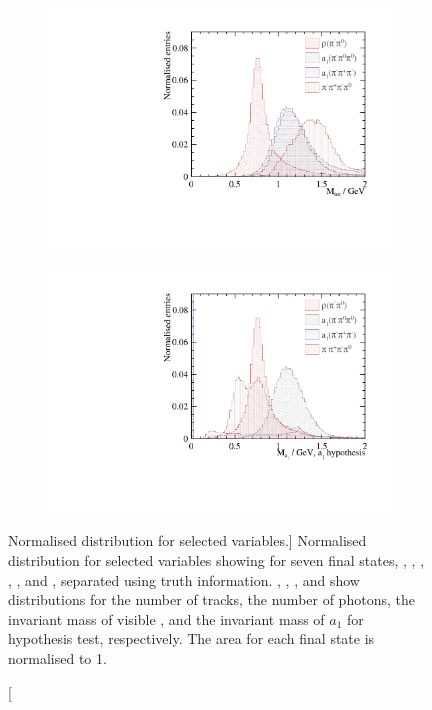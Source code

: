 \begin{figure}[htbp]
\begin{subfigure}[b]{0.45\textwidth}
  \caption{}
  \label{fig:tauVarNPhoton}
\end{subfigure}
\begin{subfigure}[b]{0.45\textwidth}
 \includegraphics[width=\textwidth]{tau/var2/mVis_100GeV_improved_zoom.pdf}
  \caption{}
  \label{fig:tauVarMVis}
\end{subfigure}
\begin{subfigure}[b]{0.45\textwidth}
 \includegraphics[width=\textwidth]{tau/var2/mA1A1Fit_100GeV_improved_zoom.pdf}
  \caption{}
  \label{fig:tauVarMA1}
\end{subfigure}

\caption
[Normalised distribution for selected variables.]
{
Normalised distribution for selected variables showing for seven final states, \decayElectronShort, \decayMuonShort, \decayPionShort, \decayRhoShort, \decayAiPhotonShort, \decayAiPionShort and \decayThreePionPhotonShort, separated using truth information. , , , and  show distributions for the number of tracks, the number of photons, the invariant mass of visible \PFOs, and the invariant mass of $a_1$ for \decayAiPhotonShort hypothesis test, respectively. The area for each final state is normalised to 1.
}
\label{fig:tauVar}
\end{figure}

